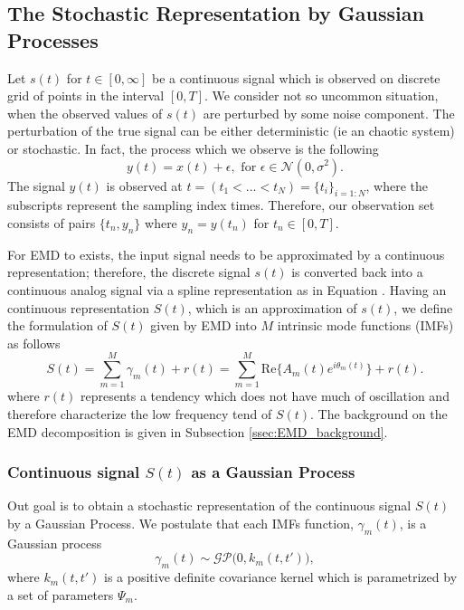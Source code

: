 \subsection{The Stochastic Representation by Gaussian Processes}
Let $s(t)$ for $t\in [0,\infty]$ be a continuous signal which is observed on discrete grid of points in the interval $[0,T]$. We consider not so uncommon situation, when the observed values of $s(t)$ are perturbed by some noise component. The perturbation of the true signal can be either deterministic (ie an chaotic system) or stochastic.  In fact, the process which we observe is the following
\begin{equation}\label{eq:signal_noisy_y}
y(t) = x(t) + \epsilon, \text{ for } \epsilon \in \mathcal{N}(0, \sigma^2).
\end{equation}
The signal $y(t)$ is observed at $t =( t_1 < \dots <t_N ) = \{ t_i \}_{i=1:N}$, where the subscripts represent the sampling index times. Therefore, our observation set consists of pairs $\big\{t_n,y_n\big\}$ where $y_n = y(t_n)$ for $t_n \in [0,T]$. 

For EMD to exists, the input signal needs to be approximated by a continuous representation; therefore, the discrete signal $s(t)$ is converted back into a continuous analog signal via a spline representation as in Equation \label{cubic_spl}. Having an continuous representation $S(t)$, which is an approximation of $s(t)$, we define the formulation of $S(t)$ given by EMD into $M$ intrinsic mode functions (IMFs) as follows 
\begin{equation}\label{eq:model_x_EMD}
S(t) = \sum_{m = 1}^M \gamma_m(t) + r(t) = \sum_{m = 1}^M \text{Re}\Big\{ A_m(t)  e^{i \theta_m(t)} \Big\} + r(t).
\end{equation}
where $r(t)$ represents a tendency which does not have much of oscillation and therefore characterize the low frequency tend of $S(t)$. The background on the EMD decomposition is given in Subsection \ref{ssec:EMD_background}.

\subsubsection{Continuous signal $S(t)$ as a Gaussian Process}
Out goal is to obtain a stochastic representation of the continuous signal $S(t)$ by a Gaussian Process. We postulate that each IMFs function, $\gamma_m(t)$, is a Gaussian process 
\begin{equation}\label{eq:model_IMF_GP_k}
\gamma_m(t) \sim \mathcal{GP} \Big(0, k_m(t,t')\Big), 
\end{equation}
where $k_m(t,t')$ is a positive definite covariance kernel which is parametrized by a set of parameters $\Psi_m$.  

